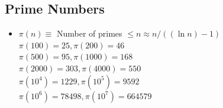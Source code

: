 \documentclass[a4paper,10pt,twocolumn,oneside]{article}
\begin{document}
\subsection{Prime Numbers}
{\normalsize
\begin{itemize}




\item $\pi(n) \equiv$ Number of primes $\leq n \approx n/((\ln n) - 1)$ \\
$\pi(100) = 25, \pi(200) = 46$ \\
$\pi(500) = 95, \pi(1000) = 168$ \\
$\pi(2000) = 303, \pi(4000) = 550$ \\
$\pi(10^4) = 1229, \pi(10^5) = 9592$ \\
$\pi(10^6) = 78498, \pi(10^7) = 664579$ \\
 
\end{itemize}
}



\newpage

\end{document}
